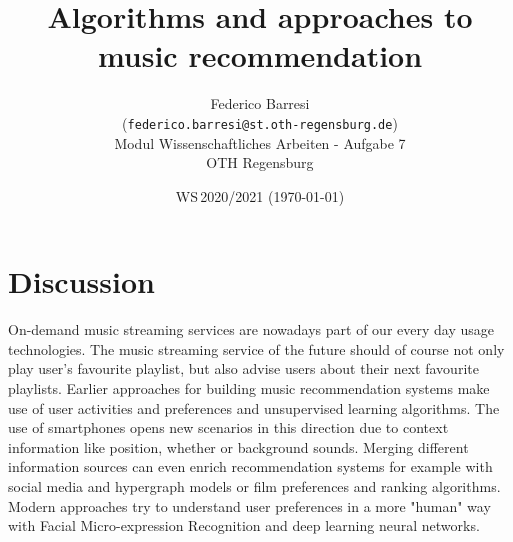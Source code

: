 \documentclass[11pt,twoside,a4paper]{article}
\begin{document}
\title{Algorithms and approaches to music recommendation}
\author{Federico Barresi \\
  (\texttt{federico.barresi@st.oth-regensburg.de})\\[5mm]
  Modul Wissenschaftliches Arbeiten - Aufgabe 7\\
  OTH Regensburg
}
  
\date{WS\,2020/2021 (\today)}

\maketitle


\section{Discussion}
On-demand music streaming services are nowadays part of our every day usage technologies.
The music streaming service of the future should of course not only play user's favourite playlist, 
but also advise users about their next favourite playlists. 
Earlier approaches for building music recommendation systems make 
use of user activities and preferences and unsupervised learning algorithms\cite{Kim2007}.
The use of smartphones opens new scenarios in this direction due to context information\cite{Dolatkia2016}
like position, whether or background sounds. 
Merging different information sources can even enrich recommendation systems for example with 
social media and hypergraph models\cite{Tan2011} or film preferences and ranking algorithms\cite{Shan2009}.
Modern approaches try to understand user preferences in a more "human" 
way with Facial Micro-expression Recognition and deep learning neural networks\cite{Yu2020}.


{}

\end{document}
